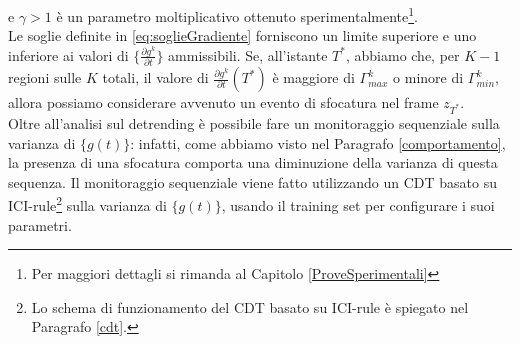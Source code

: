 e $\gamma>1$ \`e un parametro moltiplicativo ottenuto sperimentalmente\footnote{Per maggiori dettagli si rimanda al Capitolo \ref{ProveSperimentali}}.\\
Le soglie definite in \eqref{eq:soglieGradiente} forniscono un limite superiore e uno inferiore ai valori di $\{\frac{\partial g^k}{\partial t}\}$ ammissibili.
Se, all'istante $T^*$, abbiamo che, per $K-1$ regioni sulle $K$ totali, il valore di $\frac{\partial g^k}{\partial t}(T^*)$ \`e maggiore di $\Gamma_{max}^k$ o minore di $\Gamma_{min}^k$, allora possiamo considerare avvenuto un evento di sfocatura nel frame $z_{T^*}$. \\  
Oltre all'analisi sul detrending \`e possibile fare un monitoraggio sequenziale sulla varianza di $\{g(t)\}$: infatti, come abbiamo visto nel Paragrafo \ref{comportamento}, la presenza di una sfocatura comporta una diminuzione della varianza di questa sequenza.
Il monitoraggio sequenziale viene fatto utilizzando un CDT basato su ICI-rule\footnote{Lo schema di funzionamento del CDT basato su ICI-rule \`e spiegato nel Paragrafo \ref{cdt}.} sulla varianza di $\{g(t)\}$, usando il training set per configurare i suoi parametri.


